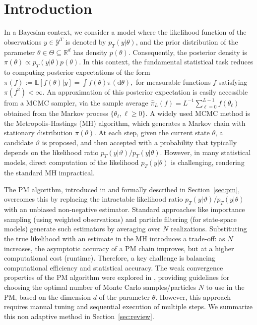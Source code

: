 \documentclass[pdflatex,sn-mathphys-num]{sn-jnl}
\newcommand{\E}{\mathbb{E}}
\renewcommand{\geq}{\geqslant}
\theoremstyle{thmstyleone}
\theoremstyle{thmstyletwo}
\theoremstyle{thmstylethree}
\begin{document}
\section{Introduction}
\label{sec:intro}
In a Bayesian context, we consider a model where the likelihood function of the observations $y \in \mathcal{Y}^T$ is denoted by $p_T(y \lvert \theta)$, and the prior distribution of the parameter \mbox{$\theta\in\Theta\subseteq\mathbb{R}^d
$} has density $p(\theta)$. Consequently, the posterior density is \mbox{$\pi(\theta) \propto p_T(y \lvert \theta) p(\theta)$}. In this context, the fundamental statistical task reduces to computing posterior expectations of the form $ \pi(f) := \E[f(\theta)|y] = \int f(\theta) \pi(\mathrm{d}\theta),$ for measurable functions $f$ satisfying $\pi(f^2) < \infty$. An approximation of this posterior expectation is easily accessible from a MCMC sampler, via the sample average $\widehat{\pi}_L(f) = L^{-1}\sum_{\ell=0}^{L-1} f(\theta_\ell)$ obtained from the Markov process $\{\theta_\ell, \ell\geq 0\}$. A widely used MCMC method is the Metropolis-Hastings (MH) algorithm, which generates a Markov chain with stationary distribution $\pi(\theta)$. At each step, given the current state $\theta$, a candidate $\vartheta$ is proposed, and then accepted with a probability that typically depends on the likelihood ratio $p_T(y \lvert \vartheta)/p_T(y \lvert \theta)$. However, in many statistical models, direct computation of the likelihood \( p_T(y|\theta) \) is challenging, rendering the standard MH impractical.

The PM algorithm, introduced in \cite{andrieu_convergence_2015} and formally described in Section~\ref{sec:pm}, overcomes this by replacing the intractable likelihood ratio $p_T(y \lvert \vartheta)/p_T(y \lvert \theta)$ with an unbiased non-negative estimator. Standard approaches like importance sampling (using weighted observations) and particle filtering (for state-space models) generate such estimators by averaging over $N$ realizations. Substituting the true likelihood with an estimate in the MH introduces a trade-off: as \( N \) increases, the asymptotic accuracy of a PM chain improves, but at a higher computational cost (runtime). Therefore, a key challenge is balancing computational efficiency and statistical accuracy. The weak convergence properties of the PM algorithm were explored in \cite{schmon_large-sample_2021}, providing guidelines for choosing the optimal number of Monte Carlo samples/particles \( N \) to use in the PM, based on the dimension \( d \) of the parameter $\theta$. However, this approach requires manual tuning and sequential execution of multiple steps. We summarize this non adaptive method in Section~\ref{sec:review}.
\end{document}
